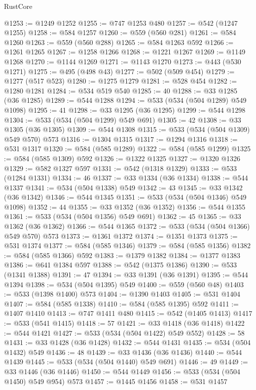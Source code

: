 \begin{lexlean}{RustCore}
\begin{coremodule}
@1253 := @1249 @1252
@1255 := @747 @1253 @480
@1257 := @542 (@1247 @1255)
@1258 := @584 @1257
@1260 := @559 (@560 @281)
@1261 := @584 @1260
@1263 := @559 (@560 @288)
@1265 := @584 @1263 @592
@1266 := @1261 @1265
@1267 := @1258 @1266
@1268 := @1221 @1267
@1269 := @1149 @1268
@1270 := @1144 @1269
@1271 := @1143 @1270
@1273 := @443 (@530 @1271)
@1275 := @495 (@498 @43)
@1277 := @502 (@509 @454)
@1279 := @1277 (@517 @523)
@1280 := @1275 @1279
@1281 := @528 @454
@1282 := @1280 @1281
@1284 := @534 @519 @540
@1285 := 40
@1288 := @33 @1285 (@36 @1285)
@1289 := @544 @1288
@1294 := @533 (@534 (@504 @1289) @549 @1098)
@1295 := 41
@1298 := @33 @1295 (@36 @1295)
@1299 := @544 @1298
@1304 := @533 (@534 (@504 @1299) @549 @691)
@1305 := 42
@1308 := @33 @1305 (@36 @1305)
@1309 := @544 @1308
@1315 := @533 (@534 (@504 @1309) @549 @570) @573
@1316 := @1304 @1315
@1317 := @1294 @1316
@1318 := @531 @1317
@1320 := @584 (@585 @1289)
@1322 := @584 (@585 @1299)
@1325 := @584 (@585 @1309) @592
@1326 := @1322 @1325
@1327 := @1320 @1326
@1329 := @582 @1327 @597
@1331 := @542 (@1318 @1329)
@1333 := @533 (@1284 @1331)
@1334 := 46
@1337 := @33 @1334 (@36 @1334)
@1338 := @544 @1337
@1341 := @534 (@504 @1338) @549
@1342 := 43
@1345 := @33 @1342 (@36 @1342)
@1346 := @544 @1345
@1351 := @533 (@534 (@504 @1346) @549 @1098)
@1352 := 44
@1355 := @33 @1352 (@36 @1352)
@1356 := @544 @1355
@1361 := @533 (@534 (@504 @1356) @549 @691)
@1362 := 45
@1365 := @33 @1362 (@36 @1362)
@1366 := @544 @1365
@1372 := @533 (@534 (@504 @1366) @549 @570) @573
@1373 := @1361 @1372
@1374 := @1351 @1373
@1375 := @531 @1374
@1377 := @584 (@585 @1346)
@1379 := @584 (@585 @1356)
@1382 := @584 (@585 @1366) @592
@1383 := @1379 @1382
@1384 := @1377 @1383
@1386 := @641 @1384 @597
@1388 := @542 (@1375 @1386)
@1390 := @533 (@1341 @1388)
@1391 := 47
@1394 := @33 @1391 (@36 @1391)
@1395 := @544 @1394
@1398 := @534 (@504 @1395) @549
@1400 := @559 (@560 @48)
@1403 := @533 (@1398 @1400) @573
@1404 := @1390 @1403
@1405 := @531 @1404
@1407 := @584 (@585 @1338)
@1410 := @584 (@585 @1395) @592
@1411 := @1407 @1410
@1413 := @747 @1411 @480
@1415 := @542 (@1405 @1413)
@1417 := @533 (@541 @1415)
@1418 := 57
@1421 := @33 @1418 (@36 @1418)
@1422 := @544 @1421
@1427 := @533 (@534 (@504 @1422) @549 @552)
@1428 := 58
@1431 := @33 @1428 (@36 @1428)
@1432 := @544 @1431
@1435 := @534 (@504 @1432) @549
@1436 := 48
@1439 := @33 @1436 (@36 @1436)
@1440 := @544 @1439
@1445 := @533 (@534 (@504 @1440) @549 @691)
@1446 := 49
@1449 := @33 @1446 (@36 @1446)
@1450 := @544 @1449
@1456 := @533 (@534 (@504 @1450) @549 @954) @573
@1457 := @1445 @1456
@1458 := @531 @1457

\end{coremodule}
\end{lexlean}
